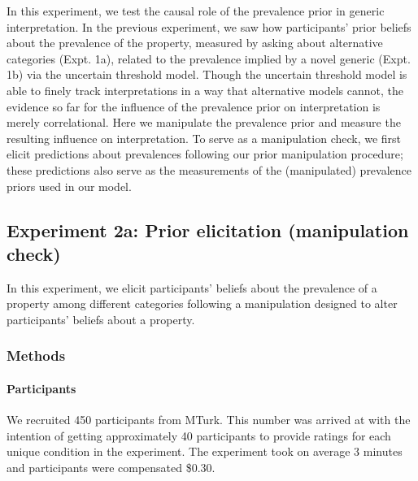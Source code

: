 \documentclass[floatsintext,doc]{apa6}
\let\oldparagraph\paragraph
\renewcommand{\paragraph}[1]{\oldparagraph{#1}\mbox{}}
\begin{document}
In this experiment, we test the causal role of the prevalence prior in generic interpretation.
In the previous experiment, we saw how participants' prior beliefs about the prevalence of the property, measured by asking about alternative categories (Expt. 1a), related to the prevalence implied by a novel generic (Expt. 1b) via the uncertain threshold model.
Though the uncertain threshold model is able to finely track interpretations in a way that alternative models cannot, the evidence so far for the influence of the prevalence prior on interpretation is merely correlational.
Here we manipulate the prevalence prior and measure the resulting influence on interpretation.
To serve as a manipulation check, we first elicit predictions about prevalences following our prior manipulation procedure; these predictions also serve as the measurements of the (manipulated) prevalence priors used in our model.

\hypertarget{experiment-2a-prior-elicitation-manipulation-check}{%
\subsection{Experiment 2a: Prior elicitation (manipulation check)}\label{experiment-2a-prior-elicitation-manipulation-check}}

In this experiment, we elicit participants' beliefs about the prevalence of a property among different categories following a manipulation designed to alter participants' beliefs about a property.


\hypertarget{methods-2}{%
\subsubsection{Methods}\label{methods-2}}

\hypertarget{participants-3}{%
\paragraph{Participants}\label{participants-3}}
%
We recruited 450 participants from MTurk.
This number was arrived at with the intention of getting approximately 40 participants to provide ratings for each unique condition in the experiment.
The experiment took on average 3 minutes and participants were compensated \$0.30.
\end{document}
